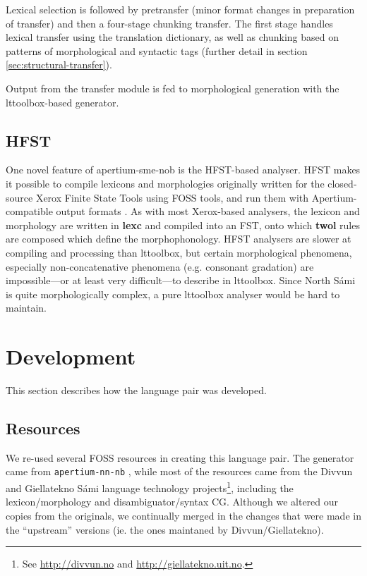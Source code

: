 \documentclass{book}
\begin{document}
Lexical selection is followed by pretransfer (minor format changes in
preparation of transfer) and then a four-stage chunking transfer. The
first stage handles lexical transfer using the translation dictionary,
as well as chunking based on patterns of morphological and syntactic
tags (further detail in section \ref{sec:structural-transfer}).

Output from the transfer module is fed to morphological generation
with the lttoolbox-based \nob{} generator.

\subsection{HFST}
\label{sec:hfst}
One novel feature of apertium-sme-nob is the HFST-based analyser. HFST
makes it possible to compile lexicons and morphologies originally
written for the closed-source Xerox Finite State Tools using FOSS
tools, and run them with Apertium-compatible output formats
\citep{pirinen2011compiling}. As with most Xerox-based analysers, the
\sme{} lexicon and morphology are written in \textbf{lexc} and
compiled into an FST, onto which \textbf{twol} rules are composed
which define the morphophonology. HFST analysers are slower at
compiling and processing than lttoolbox, but certain morphological
phenomena, especially non-concatenative phenomena (e.g. \sme{}
consonant gradation) are impossible---or at least very difficult---to
describe in lttoolbox. Since North S\'{a}mi is quite morphologically
complex, a pure lttoolbox analyser would be hard to maintain.


\section{Development}
  \label{sec:development}

This section describes how the language pair was developed.
\subsection{Resources}
We re-used several FOSS resources in creating this language pair. The
\nob{} generator came from {\tt apertium-nn-nb}
\citep{unhammer2009rfr}, while most of the \sme{} resources came from
the Divvun and Giellatekno S\'{a}mi language technology
projects\footnote{See \href{http://divvun.no}{http://divvun.no} and
  \href{http://giellatekno.uit.no}{http://giellatekno.uit.no}.},
including the lexicon/morphology and disambiguator/syntax CG. Although
we altered our copies from the originals, we continually merged in the
changes that were made in the ``upstream'' versions (ie. the ones
maintaned by Divvun/Giellatekno).
\end{document}
